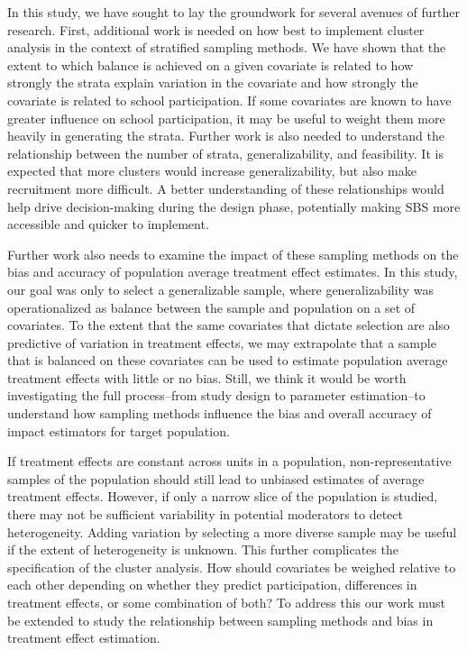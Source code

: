\documentclass[
  man,floatsintext]{apa6}
\begin{document}
In this study, we have sought to lay the groundwork for several avenues of further research. First, additional work is needed on how best to implement cluster analysis in the context of stratified sampling methods. We have shown that the extent to which balance is achieved on a given covariate is related to how strongly the strata explain variation in the covariate and how strongly the covariate is related to school participation. If some covariates are known to have greater influence on school participation, it may be useful to weight them more heavily in generating the strata. Further work is also needed to understand the relationship between the number of strata, generalizability, and feasibility. It is expected that more clusters would increase generalizability, but also make recruitment more difficult. A better understanding of these relationships would help drive decision-making during the design phase, potentially making SBS more accessible and quicker to implement.

Further work also needs to examine the impact of these sampling methods on the bias and accuracy of population average treatment effect estimates. In this study, our goal was only to select a generalizable sample, where generalizability was operationalized as balance between the sample and population on a set of covariates. To the extent that the same covariates that dictate selection are also predictive of variation in treatment effects, we may extrapolate that a sample that is balanced on these covariates can be used to estimate population average treatment effects with little or no bias. Still, we think it would be worth investigating the full process--from study design to parameter estimation--to understand how sampling methods influence the bias and overall accuracy of impact estimators for target population.

If treatment effects are constant across units in a population, non-representative samples of the population should still lead to unbiased estimates of average treatment effects. However, if only a narrow slice of the population is studied, there may not be sufficient variability in potential moderators to detect heterogeneity. Adding variation by selecting a more diverse sample may be useful if the extent of heterogeneity is unknown. This further complicates the specification of the cluster analysis. How should covariates be weighed relative to each other depending on whether they predict participation, differences in treatment effects, or some combination of both? To address this our work must be extended to study the relationship between sampling methods and bias in treatment effect estimation.
\end{document}
